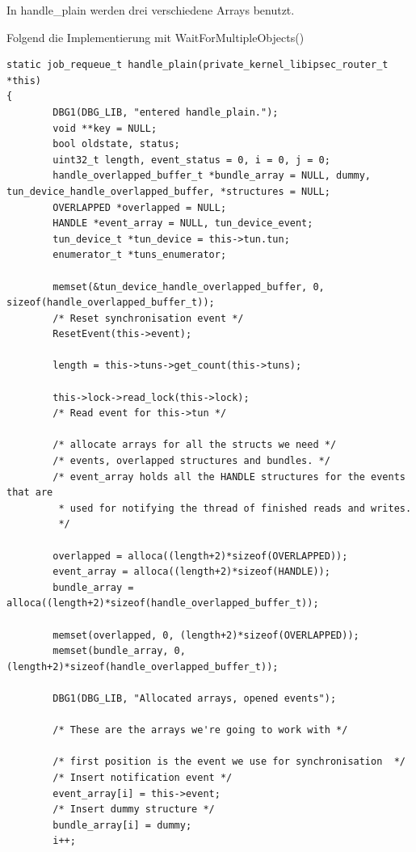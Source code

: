 In handle\_plain werden drei verschiedene Arrays benutzt.


Folgend die Implementierung mit WaitForMultipleObjects()
\begin{lstlisting}[caption=Code für handle\_plain auf Windows]
static job_requeue_t handle_plain(private_kernel_libipsec_router_t *this)
{
        DBG1(DBG_LIB, "entered handle_plain.");
        void **key = NULL;
        bool oldstate, status;
        uint32_t length, event_status = 0, i = 0, j = 0;
        handle_overlapped_buffer_t *bundle_array = NULL, dummy, tun_device_handle_overlapped_buffer, *structures = NULL;
        OVERLAPPED *overlapped = NULL;
        HANDLE *event_array = NULL, tun_device_event;
        tun_device_t *tun_device = this->tun.tun;
        enumerator_t *tuns_enumerator;

        memset(&tun_device_handle_overlapped_buffer, 0, sizeof(handle_overlapped_buffer_t));
        /* Reset synchronisation event */
        ResetEvent(this->event);

        length = this->tuns->get_count(this->tuns);

        this->lock->read_lock(this->lock);
        /* Read event for this->tun */

        /* allocate arrays for all the structs we need */
        /* events, overlapped structures and bundles. */
        /* event_array holds all the HANDLE structures for the events that are
         * used for notifying the thread of finished reads and writes.
         */

        overlapped = alloca((length+2)*sizeof(OVERLAPPED));
        event_array = alloca((length+2)*sizeof(HANDLE));
        bundle_array = alloca((length+2)*sizeof(handle_overlapped_buffer_t));

        memset(overlapped, 0, (length+2)*sizeof(OVERLAPPED));
        memset(bundle_array, 0, (length+2)*sizeof(handle_overlapped_buffer_t));

        DBG1(DBG_LIB, "Allocated arrays, opened events");

        /* These are the arrays we're going to work with */

        /* first position is the event we use for synchronisation  */
        /* Insert notification event */
        event_array[i] = this->event;
        /* Insert dummy structure */
        bundle_array[i] = dummy;
        i++;


\end{lstlisting}

